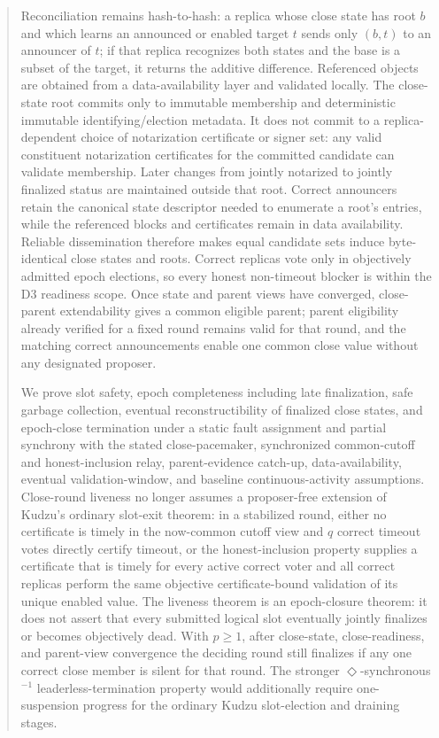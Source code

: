 \documentclass[11pt]{article}
\theoremstyle{definition}
\theoremstyle{remark}
\begin{document}
\begin{abstract}
Reconciliation remains hash-to-hash: a replica whose close state has root $b$ and which learns an announced or enabled target $t$ sends only $(b,t)$ to an announcer of $t$; if that replica recognizes both states and the base is a subset of the target, it returns the additive difference. Referenced objects are obtained from a data-availability layer and validated locally. The close-state root commits only to immutable membership and deterministic immutable identifying/election metadata. It does not commit to a replica-dependent choice of notarization certificate or signer set: any valid constituent notarization certificates for the committed candidate can validate membership. Later changes from jointly notarized to jointly finalized status are maintained outside that root. Correct announcers retain the canonical state descriptor needed to enumerate a root's entries, while the referenced blocks and certificates remain in data availability. Reliable dissemination therefore makes equal candidate sets induce byte-identical close states and roots. Correct replicas vote only in objectively admitted epoch elections, so every honest non-timeout blocker is within the D3 readiness scope. Once state and parent views have converged, close-parent extendability gives a common eligible parent; parent eligibility already verified for a fixed round remains valid for that round, and the matching correct announcements enable one common close value without any designated proposer.

We prove slot safety, epoch completeness including late finalization, safe garbage collection, eventual reconstructibility of finalized close states, and epoch-close termination under a static fault assignment and partial synchrony with the stated close-pacemaker, synchronized common-cutoff and honest-inclusion relay, parent-evidence catch-up, data-availability, eventual validation-window, and baseline continuous-activity assumptions. Close-round liveness no longer assumes a proposer-free extension of Kudzu's ordinary slot-exit theorem: in a stabilized round, either no certificate is timely in the now-common cutoff view and $q$ correct timeout votes directly certify timeout, or the honest-inclusion property supplies a certificate that is timely for every active correct voter and all correct replicas perform the same objective certificate-bound validation of its unique enabled value. The liveness theorem is an epoch-closure theorem: it does not assert that every submitted logical slot eventually jointly finalizes or becomes objectively dead. With $p\ge1$, after close-state, close-readiness, and parent-view convergence the deciding round still finalizes if any one correct close member is silent for that round. The stronger $\Diamond$-synchronous$^{-1}$ leaderless-termination property would additionally require one-suspension progress for the ordinary Kudzu slot-election and draining stages.
\end{abstract}
\end{document}

